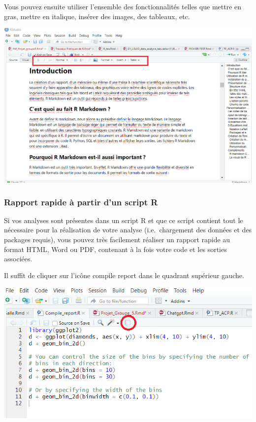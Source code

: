 \documentclass[
  12pt,
]{article}
\begin{document}
Vous pouvez ensuite utiliser l'ensemble des fonctionnalités telles que
mettre en gras, mettre en italique, insérer des images, des tableaux,
etc.

\begin{center}\includegraphics[width=1\linewidth,height=1\textheight]{../Document_Rmarkdown/Images/Le_Visual} \end{center}

\subsubsection{Rapport rapide à partir d'un script
R}\label{rapport-rapide-uxe0-partir-dun-script-r}

Si vos analyses sont présentes dans un script R et que ce script
contient tout le nécessaire pour la réalisation de votre analyse
(i.e.~chargement des données et des packages requis), vous pouvez très
facilement réaliser un rapport rapide au format HTML, Word ou PDF,
contenant à la fois votre code et les sorties associées.

Il suffit de cliquer sur l'icône compile report dans le quadrant
supérieur gauche.

\begin{center}\includegraphics[width=1\linewidth,height=1\textheight]{../Document_Rmarkdown/Images/Compile_report} \end{center}
\end{document}
